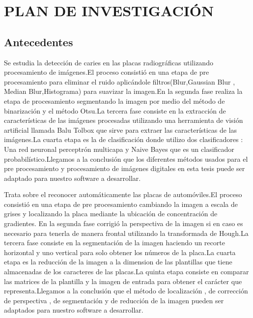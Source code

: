 \documentclass[a4paper, 12pt]{article}
\begin{document}
\newpage

\section{PLAN DE INVESTIGACIÓN}

\subsection{Antecedentes}

\citep{sirlopu2016deteccion} Se estudia la detección de caries en las placas radiográficas utilizando procesamiento de imágenes.El proceso consistió en una etapa de pre procesamiento para eliminar el ruido aplicándole filtros(Blur,Gaussian Blur , Median Blur,Histograma) para suavizar la imagen.En la segunda fase realiza la etapa de procesamiento segmentando la imagen por medio del método de binarización y el método Otsu.La tercera fase consiste en la extracción de características de las imágenes procesadas utilizando una herramienta de visión artificial llamada Balu Tolbox que sirve para extraer las características de las imágenes.La cuarta etapa es la de clasificación donde utilizo dos clasificadores : Una red neuronal perceptrón multicapa y Naive Bayes que es un clasificador probabilístico.Llegamos a la conclusión que los diferentes métodos usados para el pre procesamiento y procesamiento de imágenes digitales en esta tesis puede ser adaptado para nuestro software a desarrollar.\par


\vskip 1cm

\citep{mundaca2016deteccion} Trata sobre el reconocer automáticamente las placas de automóviles.El proceso consistió en una etapa de pre procesamiento cambiando la imagen a escala de grises y localizando la placa mediante la ubicación de concentración de gradientes. En la segunda fase corrigió la perspectiva de la imagen si en caso es necesario para tenerla de manera frontal utilizando la transformada de Hough.La tercera fase consiste en la segmentación de la imagen haciendo un recorte horizontal y uno vertical para  solo obtener los números de la placa.La cuarta etapa es la reducción de la imagen a la dimension de las plantillas que tiene almacenadas de los caracteres de las placas.La quinta etapa consiste en comparar las matrices de la plantilla y la imagen de entrada para obtener el carácter que representa.Llegamos a la conclusión que el método de localización , de corrección de perspectiva , de segmentación y de reducción de la imagen pueden ser adaptados para nuestro software a desarrollar.\par
\end{document}
